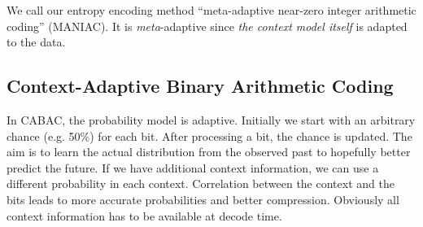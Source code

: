 \documentclass{article}
\begin{document}
We call our entropy encoding method
``meta-adaptive near-zero integer arithmetic coding''
(MANIAC).
It is {\it meta}-adaptive since {\it the context model itself}
is adapted to the data.


\subsection{Context-Adaptive Binary Arithmetic Coding}

In CABAC, the probability model is adaptive.
Initially we start with an arbitrary chance (e.g. 50\%) for each bit.
After processing a bit, the chance is updated. The aim is to learn the actual
distribution from the observed past to hopefully better predict the future.
%
If we have additional context information, we can use a different probability in each context.
Correlation between the context %
and the bits
leads to more accurate probabilities and better compression.
Obviously all context information has to be available at decode time.




\label{sec:rac:interval}
\end{document}
